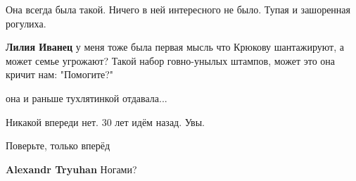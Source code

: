 \begin{itemize}
\begin{itemize}
 
Она всегда была такой. Ничего в ней интересного не было. Тупая и зашоренная рогулиха.

 
\textbf{Лилия Иванец} у меня тоже была первая мысль что Крюкову шантажируют, а может семье угрожают? Такой набор говно-унылых штампов, может это она кричит нам: "Помогите?"

 
она и раньше тухлятинкой отдавала...
\end{itemize}

 
Никакой впереди нет. 30 лет идём назад. Увы.

\begin{itemize}
 
Поверьте, только вперёд

 
\textbf{Alexandr Tryuhan} Ногами?
\end{itemize}

 


\end{itemize}
